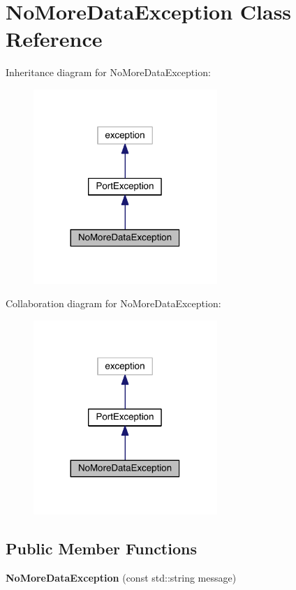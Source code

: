 \hypertarget{class_no_more_data_exception}{}\section{No\+More\+Data\+Exception Class Reference}
\label{class_no_more_data_exception}


Inheritance diagram for No\+More\+Data\+Exception\+:
\nopagebreak
\begin{figure}[H]
\begin{center}
\leavevmode
\includegraphics[width=197pt]{class_no_more_data_exception__inherit__graph}
\end{center}
\end{figure}


Collaboration diagram for No\+More\+Data\+Exception\+:
\nopagebreak
\begin{figure}[H]
\begin{center}
\leavevmode
\includegraphics[width=197pt]{class_no_more_data_exception__coll__graph}
\end{center}
\end{figure}
\subsection*{Public Member Functions}
\begin{DoxyCompactItemize}
\item 
\hypertarget{class_no_more_data_exception_a0ea678409efce101125c8ad818102011}{}\label{class_no_more_data_exception_a0ea678409efce101125c8ad818102011} 
{\bfseries No\+More\+Data\+Exception} (const std\+::string message)
\end{DoxyCompactItemize}


